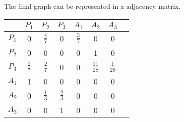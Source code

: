 \documentclass{article}
\begin{document}
\noindent The final graph can be represented in a adjacency matrix.
\begin{center}
  \begin{tabular}{c | c c c c c c c}
    & $P_1$ & $P_2$ & $P_3$ & $A_1$ & $A_2$ & $A_3$ \\
    \hline
    $P_1$ & 0 & $\frac{4}{7}$ & 0 & $\frac{3}{7}$ & 0 & 0 \\
    $P_2$ & 0 & 0 & 0 & 0 & 1 & 0 \\
    $P_3$ & $\frac{2}{7}$ & $\frac{2}{7}$ & 0 & 0 & $\frac{11}{28}$ & $\frac{1}{28}$ \\
    $A_1$ & 1 & 0 & 0 & 0 & 0 & 0 \\
    $A_2$ & 0 & $\frac{1}{3}$ & $\frac{2}{3}$ & 0 & 0 & 0 \\
    $A_3$ & 0 & 0 & 1 & 0 & 0 & 0 \\
  \end{tabular}
\end{center}
\end{document}
